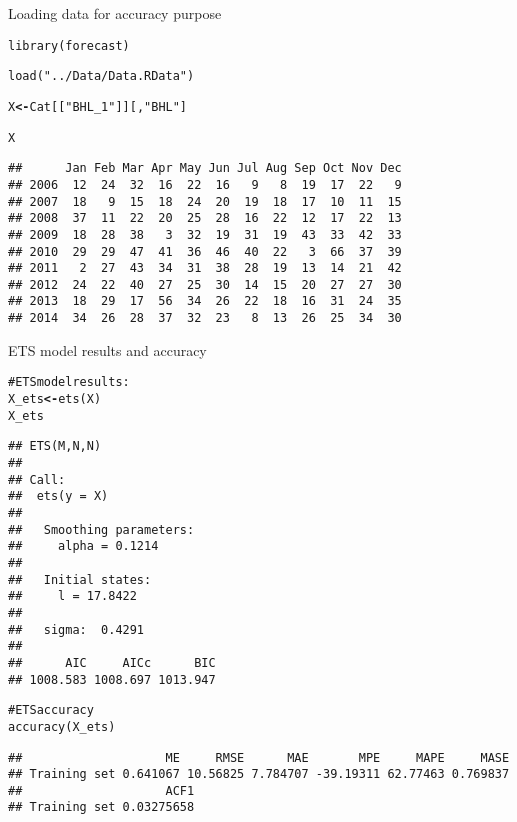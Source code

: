 \documentclass[10pt,a4paper]{article}\usepackage[]{graphicx}\usepackage[]{color}
\makeatletter
\newcommand{\hlstr}[1]{\textcolor[rgb]{0.651,0.522,0}{#1}}%
\newcommand{\hlcom}[1]{\textcolor[rgb]{1,0.502,0}{#1}}%
\newcommand{\hlstd}[1]{\textcolor[rgb]{0,0,0}{#1}}%
\newcommand{\hlkwb}[1]{\textcolor[rgb]{0.502,0.502,0.753}{\textbf{#1}}}%
\newcommand{\hlkwd}[1]{\textcolor[rgb]{0,0.267,0.4}{#1}}%
\newenvironment{kframe}{%
 \def\at@end@of@kframe{}%
 \ifinner\ifhmode%
  \def\at@end@of@kframe{\end{minipage}}%
  \begin{minipage}{\columnwidth}%
 \fi\fi%
 \def\FrameCommand##1{\hskip\@totalleftmargin \hskip-\fboxsep
 \colorbox{shadecolor}{##1}\hskip-\fboxsep
     \hskip-\linewidth \hskip-\@totalleftmargin \hskip\columnwidth}%
 \MakeFramed {\advance\hsize-\width
   \@totalleftmargin\z@ \linewidth\hsize
   \@setminipage}}%
 {\par\unskip\endMakeFramed%
 \at@end@of@kframe}
\newenvironment{knitrout}{}{} %
\makeatother
\begin{document}
Loading data for accuracy purpose

\begin{knitrout}
\color{fgcolor}\begin{kframe}
\begin{alltt}
\hlkwd{library}\hlstd{(forecast)}

\hlkwd{load}\hlstd{(}\hlstr{"../Data/Data.RData"}\hlstd{)}

\hlstd{X} \hlkwb{<-} \hlstd{Cat[[}\hlstr{"BHL_1"}\hlstd{]][,}\hlstr{"BHL"}\hlstd{]}

\hlstd{X}
\end{alltt}
\begin{verbatim}
##      Jan Feb Mar Apr May Jun Jul Aug Sep Oct Nov Dec
## 2006  12  24  32  16  22  16   9   8  19  17  22   9
## 2007  18   9  15  18  24  20  19  18  17  10  11  15
## 2008  37  11  22  20  25  28  16  22  12  17  22  13
## 2009  18  28  38   3  32  19  31  19  43  33  42  33
## 2010  29  29  47  41  36  46  40  22   3  66  37  39
## 2011   2  27  43  34  31  38  28  19  13  14  21  42
## 2012  24  22  40  27  25  30  14  15  20  27  27  30
## 2013  18  29  17  56  34  26  22  18  16  31  24  35
## 2014  34  26  28  37  32  23   8  13  26  25  34  30
\end{verbatim}
\end{kframe}
\end{knitrout}

ETS model results and accuracy

\begin{knitrout}
\color{fgcolor}\begin{kframe}
\begin{alltt}
\hlcom{#ETS model results:}
\hlstd{X_ets} \hlkwb{<-} \hlkwd{ets}\hlstd{(X)}
\hlstd{X_ets}
\end{alltt}
\begin{verbatim}
## ETS(M,N,N) 
## 
## Call:
##  ets(y = X) 
## 
##   Smoothing parameters:
##     alpha = 0.1214 
## 
##   Initial states:
##     l = 17.8422 
## 
##   sigma:  0.4291
## 
##      AIC     AICc      BIC 
## 1008.583 1008.697 1013.947
\end{verbatim}
\begin{alltt}
\hlcom{# ETS accuracy}
\hlkwd{accuracy}\hlstd{(X_ets)}
\end{alltt}
\begin{verbatim}
##                    ME     RMSE      MAE       MPE     MAPE     MASE
## Training set 0.641067 10.56825 7.784707 -39.19311 62.77463 0.769837
##                    ACF1
## Training set 0.03275658
\end{verbatim}
\end{kframe}
\end{knitrout}
\end{document}
